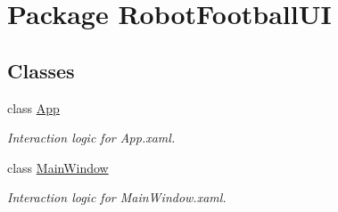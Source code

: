 \hypertarget{namespace_robot_football_u_i}{\section{Package Robot\-Football\-U\-I}
\label{namespace_robot_football_u_i}
}
\subsection*{Classes}
\begin{DoxyCompactItemize}
\item 
class \hyperlink{class_robot_football_u_i_1_1_app}{App}
\begin{DoxyCompactList}\small\item\em Interaction logic for App.\-xaml. \end{DoxyCompactList}\item 
class \hyperlink{class_robot_football_u_i_1_1_main_window}{Main\-Window}
\begin{DoxyCompactList}\small\item\em Interaction logic for Main\-Window.\-xaml. \end{DoxyCompactList}\end{DoxyCompactItemize}
